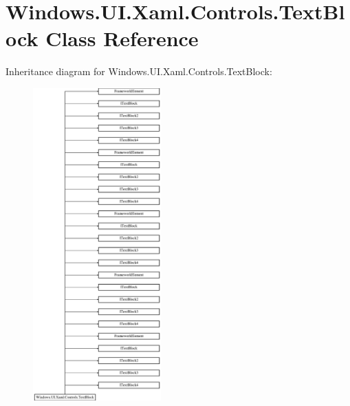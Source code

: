 \hypertarget{class_windows_1_1_u_i_1_1_xaml_1_1_controls_1_1_text_block}{}\section{Windows.\+U\+I.\+Xaml.\+Controls.\+Text\+Block Class Reference}
\label{class_windows_1_1_u_i_1_1_xaml_1_1_controls_1_1_text_block}
Inheritance diagram for Windows.\+U\+I.\+Xaml.\+Controls.\+Text\+Block\+:\begin{figure}[H]
\begin{center}
\leavevmode
\includegraphics[height=12.000000cm]{class_windows_1_1_u_i_1_1_xaml_1_1_controls_1_1_text_block}
\end{center}
\end{figure}
